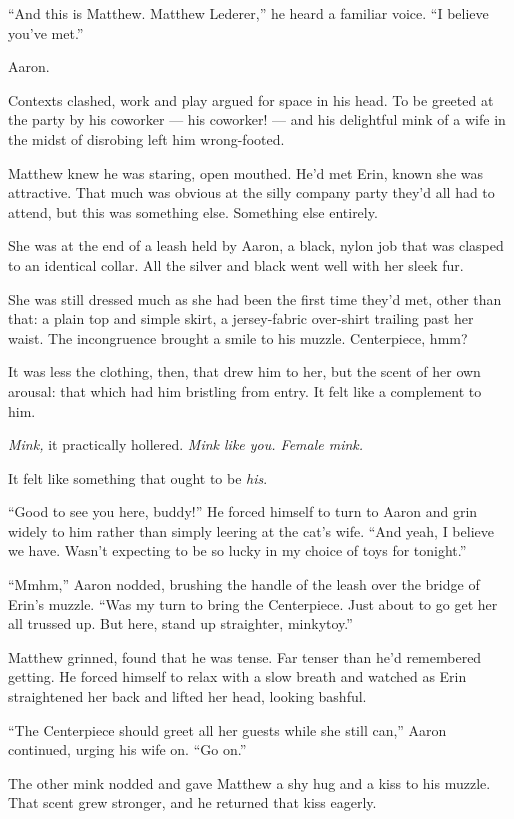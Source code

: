 ``And this is Matthew. Matthew Lederer,'' he heard a familiar voice. ``I believe you've met.''

Aaron.

Contexts clashed, work and play argued for space in his head. To be greeted at the party by his coworker --- his coworker! --- and his delightful mink of a wife in the midst of disrobing left him wrong-footed.

Matthew knew he was staring, open mouthed. He'd met Erin, known she was attractive. That much was obvious at the silly company party they'd all had to attend, but this was something else. Something else entirely.

She was at the end of a leash held by Aaron, a black, nylon job that was clasped to an identical collar. All the silver and black went well with her sleek fur.

She was still dressed much as she had been the first time they'd met, other than that: a plain top and simple skirt, a jersey-fabric over-shirt trailing past her waist. The incongruence brought a smile to his muzzle. Centerpiece, hmm?

It was less the clothing, then, that drew him to her, but the scent of her own arousal: that which had him bristling from entry. It felt like a complement to him.

\emph{Mink,} it practically hollered. \emph{Mink like you. Female mink.}

It felt like something that ought to be \emph{his}.

``Good to see you here, buddy!'' He forced himself to turn to Aaron and grin widely to him rather than simply leering at the cat's wife. ``And yeah, I believe we have. Wasn't expecting to be so lucky in my choice of toys for tonight.''

``Mmhm,'' Aaron nodded, brushing the handle of the leash over the bridge of Erin's muzzle. ``Was my turn to bring the Centerpiece. Just about to go get her all trussed up. But here, stand up straighter, minkytoy.''

Matthew grinned, found that he was tense. Far tenser than he'd remembered getting. He forced himself to relax with a slow breath and watched as Erin straightened her back and lifted her head, looking bashful.

``The Centerpiece should greet all her guests while she still can,'' Aaron continued, urging his wife on. ``Go on.''

The other mink nodded and gave Matthew a shy hug and a kiss to his muzzle. That scent grew stronger, and he returned that kiss eagerly.


